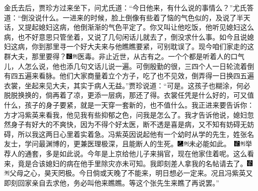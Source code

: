 金氏去后，贾珍方过来坐下，问尤氏道：“今日他来，有什么说的事情么？”尤氏答道：“倒没说什么。一进来的时候，脸上倒像有些着了恼的气色似的，及说了半天话，又提起媳妇这病，他倒渐渐的气色平定了。你又叫让他吃饭，他听见媳妇这么病，也不好意思只管坐着，又说了几句闲话儿就去了，倒没求什么事。如今且说媳妇这病，你到那里寻一个好大夫来与他瞧瞧要紧，可别耽误了。现今咱们家走的这群大夫，那里要得？{\includegraphics[width=3mm]{../Images/00006}\includegraphics[width=3mm]{../Images/00011}\footnotesize \kaishu 医毒。非止近世，从古有之。}一个个都是听着人的口气儿，人怎么说，他也添几句文话儿说一遍。可倒殷勤的很，三四个人一日轮流着倒有四五遍来看脉。他们大家商量着立个方子，吃了也不见效，倒弄得一日换四五遍衣裳，坐起来见大夫，其实于病人无益。”贾珍说道：“可是。这孩子也糊涂，何必脱脱换换的，倘再着了凉，更添一层病，那还了得。衣裳任凭是什么好的，可又值什么，孩子的身子要紧，就是一天穿一套新的，也不值什么。我正进来要告诉你：方才冯紫英来看我，他见我有些抑郁之色，问我是怎么了。我才告诉他说，媳妇忽然身子有好大的不爽快，因为不得个好太医，断不透是喜是病，又不知有妨碍无妨碍，所以我这两日心里着实着急。冯紫英因说起他有一个幼时从学的先生，姓张名友士，学问最渊博的，更兼医理极深，且能断人的生死。{\includegraphics[width=3mm]{../Images/00003}\includegraphics[width=3mm]{../Images/00011}\footnotesize \kaishu 未必能如此。　\includegraphics[width=3mm]{../Images/00006}\includegraphics[width=3mm]{../Images/00011}\footnotesize \kaishu 举荐人的通套，多是如此说。}今年是上京给他儿子来捐官，现在他家住着呢。这么看来，竟是合该媳妇的病在他手里除灾亦未可知。我即刻差人拿我的名帖请去了。{\includegraphics[width=3mm]{../Images/00006}\includegraphics[width=3mm]{../Images/00011}\footnotesize \kaishu 父母之心，昊天罔极。}今日倘或天晚了不能来，明日想必一定来。况且冯紫英又即刻回家亲自去求他，务必叫他来瞧瞧。等这个张先生来瞧了再说罢。”

